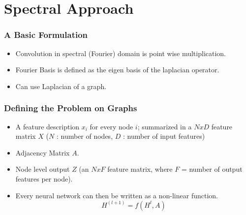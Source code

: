 \documentclass{beamer}
\begin{document}
\section{Spectral Approach}
\begin{frame}
  \frametitle{A Basic Formulation}
  \begin{itemize}
  \item Convolution in spectral (Fourier) domain is point wise multiplication.
  \item Fourier Basis is defined as the eigen basis of the laplacian operator.
  \item Can use Laplacian of a graph.
  \end{itemize}
\end{frame}

\begin{frame}
  \frametitle{Defining the Problem on Graphs}
  \begin{itemize}
  \item <1-> A feature description $x_i$ for every node $i$; summarized in a $N x D$ feature matrix $X$ ($N$ : number of nodes, $D$ : number of input features)
  \item <2-> Adjacency Matrix $A$.
  \item <3-> Node level output $Z$ (an $N x F$ feature matrix, where $F$ = number of output features per node).
  \item <4-> Every neural network can then be written as a non-linear function.
    $$H^{(l+1)} = f(H^{l}, A)$$
  \end{itemize}
\end{frame}
\end{document}
